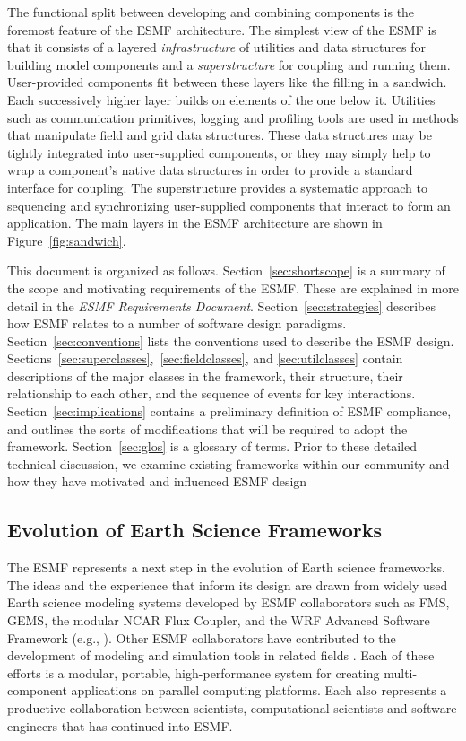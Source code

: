 The functional split between developing and combining components is the
foremost feature of the ESMF architecture.  The simplest view of the ESMF 
is that it consists of a layered {\it infrastructure} of utilities and data 
structures for building model components and a {\it superstructure} for coupling 
and running them.  User-provided components fit between these 
layers like the filling in a sandwich.  Each successively higher layer builds
on elements of the one below it.  Utilities such as communication
primitives, logging and profiling tools are used in methods that
manipulate field and grid data structures.  These data structures may be
tightly integrated into user-supplied components, or they may simply 
help to wrap a component's native data structures in order to provide 
a standard interface for coupling.  The superstructure provides a systematic 
approach to sequencing and synchronizing user-supplied components that 
interact to form an application.  The main layers in the ESMF architecture are 
shown in Figure~\ref{fig:sandwich}.  

This document is organized as follows.  Section~\ref{sec:shortscope} is a summary of the 
scope and motivating requirements of the ESMF.  These are explained in more detail in 
the {\it ESMF Requirements Document}.
Section~\ref{sec:strategies} describes how ESMF relates 
to a number of software design paradigms.  Section~\ref{sec:conventions} lists the
conventions used to describe the ESMF design.
Sections~\ref{sec:superclasses},~\ref{sec:fieldclasses}, and
\ref{sec:utilclasses} contain descriptions of the 
major classes in the framework, their structure, their relationship to each other, 
and the sequence of events for key interactions.  Section~\ref{sec:implications} 
contains a preliminary definition of ESMF compliance, and outlines the sorts
of modifications that will be required to adopt the framework.  Section~\ref{sec:glos} is a 
glossary of terms. Prior to these detailed technical discussion, we examine existing frameworks within our 
community and how they have motivated and influenced ESMF design



\subsection{Evolution of Earth Science Frameworks}
\label{sec:archbackground}

The ESMF represents a next step in the evolution of Earth science
frameworks.  The ideas and the experience that inform its design
are drawn from widely used Earth science modeling systems 
developed by ESMF collaborators such as FMS, GEMS, the modular NCAR 
Flux Coupler, and the WRF Advanced Software Framework (e.g., \cite{fms, gems,
wrf, ncarcpl}).  Other ESMF collaborators 
have contributed to the development of modeling and simulation tools in related 
fields \cite{deluca, petsc}.  Each of these efforts is a modular,
portable, high-performance system for creating multi-component applications
on parallel computing platforms.  Each also represents a productive
collaboration between scientists, computational scientists and software
engineers that has continued into ESMF.  

